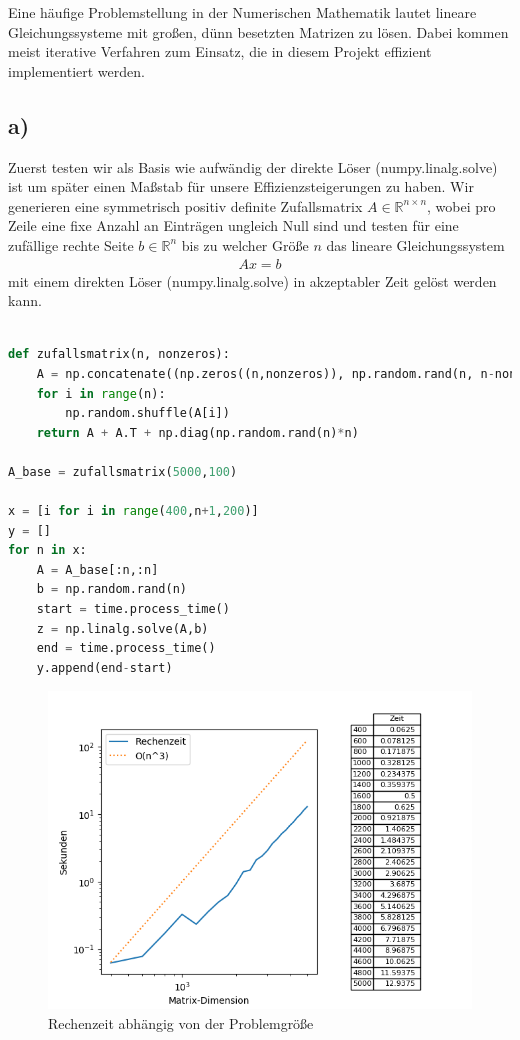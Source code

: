Eine häufige Problemstellung in der Numerischen Mathematik lautet lineare Gleichungssysteme mit großen, dünn besetzten Matrizen zu lösen.
Dabei kommen meist iterative Verfahren zum Einsatz, die in diesem Projekt effizient implementiert werden.
\subsection*{a)}
Zuerst testen wir als Basis wie aufwändig der direkte Löser (numpy.linalg.solve) ist um später einen Maßstab für unsere
Effizienzsteigerungen zu haben.
Wir generieren eine symmetrisch positiv definite Zufallsmatrix $A \in \mathbb{R}^{n\times n}$, wobei pro Zeile eine fixe Anzahl an Einträgen
ungleich Null sind und testen für eine zufällige rechte Seite $b \in \mathbb{R}^n$ bis zu welcher Größe $n$ das lineare
Gleichungssystem
\begin{align*}
  Ax = b
\end{align*}
mit einem direkten Löser (numpy.linalg.solve) in akzeptabler Zeit gelöst werden kann.
\begin{lstlisting}[language=Python]

def zufallsmatrix(n, nonzeros):
	A = np.concatenate((np.zeros((n,nonzeros)), np.random.rand(n, n-nonzeros)), axis = 1)
	for i in range(n):
		np.random.shuffle(A[i])
	return A + A.T + np.diag(np.random.rand(n)*n)

A_base = zufallsmatrix(5000,100)

x = [i for i in range(400,n+1,200)]
y = []
for n in x:
	A = A_base[:n,:n]
	b = np.random.rand(n)
	start = time.process_time()
	z = np.linalg.solve(A,b)
	end = time.process_time()
	y.append(end-start)
\end{lstlisting}
\begin{figure}
    \centering
    \includegraphics[width=\linewidth]{Aufgabe_1/plot_a.png}
    \caption{Rechenzeit abhängig von der Problemgröße}
    \label{fig:my_label}
\end{figure}
